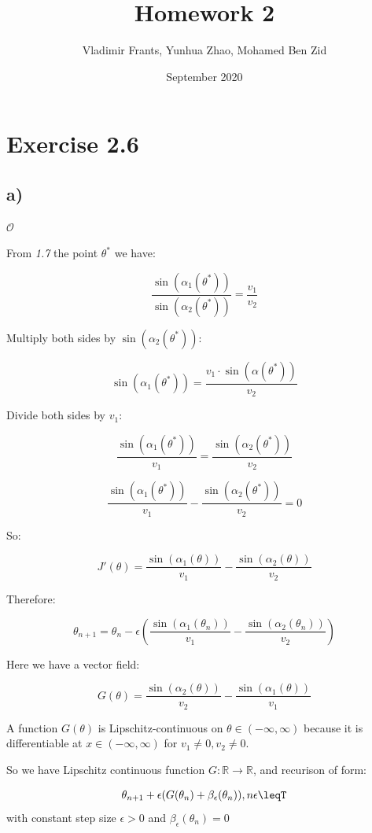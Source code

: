 \documentclass{article}
\title{Homework 2}
\author{Vladimir Frants, Yunhua Zhao, Mohamed Ben Zid}
\date{September 2020}
\begin{document}
\maketitle

\section{Exercise 2.6}

\subsection{a)}

$\mathcal{O}$


From \emph{1.7} the point $\theta^{*}$ we have: 

$$\frac{\sin(\alpha_{1}(\theta^{*}))}{\sin(\alpha_{2}(\theta^{*}))} = \frac{v_1}{v_2}$$

Multiply both sides by $\sin(\alpha_{2}(\theta^{*}))$:

$$\sin(\alpha_{1}(\theta^{*}))=\frac{v_{1}\cdot \sin(\alpha(\theta^{*}))}{v_{2}}$$

Divide both sides by $v_{1}$:

$$\frac{\sin(\alpha_{1}(\theta^{*}))}{v_{1}}=\frac{\sin(\alpha_{2}(\theta^{*}))}{v_{2}}$$

$$\frac{\sin(\alpha_{1}(\theta^{*}))}{v_{1}} - \frac{\sin(\alpha_{2}(\theta^{*}))}{v_{2}} = 0$$

So: 

$$J'(\theta)= \frac{\sin(\alpha_{1}(\theta))}{v_{1}} - \frac{\sin(\alpha_{2}(\theta))}{v_{2}}$$

Therefore:

$$\theta_{n+1} = \theta_{n} - \epsilon(\frac{\sin(\alpha_{1}(\theta_{n}))}{v_{1}} - \frac{\sin(\alpha_{2}(\theta_{n}))}{v_{2}})$$

Here we have a vector field: 

$$G(\theta) = \frac{\sin(\alpha_{2}(\theta))}{v_{2}} - \frac{\sin(\alpha_{1}(\theta))}{v_{1}}$$

A function $G(\theta)$ is Lipschitz-continuous on $\theta\in(-\infty, \infty)$ because it is differentiable at $x\in{(-\infty, \infty)}$ for $v_1 \neq 0, v_2 \neq 0$. 

So we have Lipschitz continuous function $G:\mathbb{R}\rightarrow\mathbb{R}$, and recurison of form:

$$\theta_{n+1}+\epsilon(G(\theta_{n}) + \beta_{\epsilon}(\theta_n)), n\epsilon\leqT$$
with constant step size $\epsilon > 0$ and $\beta_{\epsilon}(\theta_{n})=0$
\end{document}
